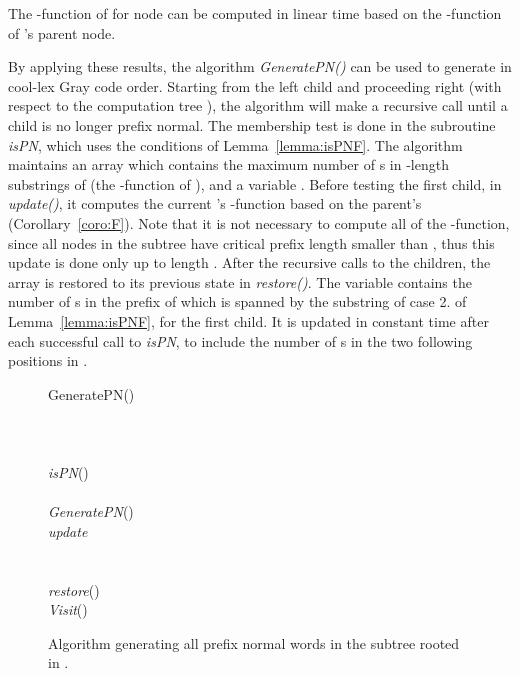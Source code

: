 \documentclass[11pt,a4paper]{llncs}
\begin{document}
\begin{corollary}\label{coro:F}
The -function of  for node  can be computed in linear time based on the -function of 's parent node.
\end{corollary}


By applying these results, the algorithm {\em GeneratePN()}  can be used to generate  in cool-lex Gray code order.  Starting from the left child and proceeding right (with respect to the computation tree ), the algorithm will make a recursive call until a child is no longer prefix normal. 
The membership test is done in the subroutine {\em isPN}, which uses the conditions of Lemma~\ref{lemma:isPNF}. The algorithm maintains an array  which contains the maximum number of s in -length substrings of  (the -function of ), and a variable . Before testing the first child, in {\em update()}, it computes the current 's -function based on the parent's (Corollary~\ref{coro:F}). Note that it is not necessary to compute all of the -function, since all nodes in the subtree have critical prefix length smaller than , thus this update is done only up to length . After the recursive calls to the children, the array is restored to its previous state in {\em restore()}. The variable  contains the number of s in the prefix of  which is spanned by the substring of case 2. of Lemma~\ref{lemma:isPNF}, for the first child. It is updated in constant time after each successful call to {\em isPN}, to include the number of s in the two following positions in .




\begin{figure}
\begin{algorithm}{GeneratePN()}{
}
  \\
\\
 \\
\\
 {\em isPN}()\\
\qdo \\
{\em GeneratePN}()\\
{\em update} \\
\\

\qend \\
{\em restore}()
\qfi \\
{\em Visit}()
\end{algorithm}
\vspace{-4mm}
\caption{Algorithm generating all prefix normal words in the subtree rooted in .\label{algo:genPN1}}
\end{figure}
\end{document}
